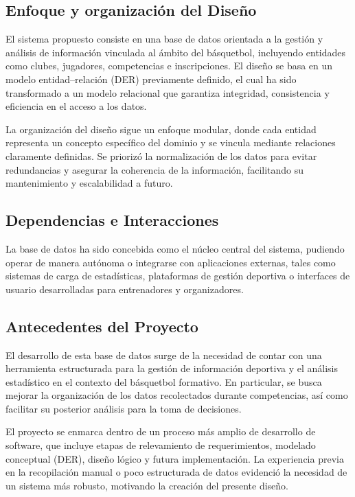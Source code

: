 \subsection{Enfoque y organización del Diseño}

El sistema propuesto consiste en una base de datos orientada a la gestión y análisis de información vinculada al ámbito del básquetbol, incluyendo entidades como clubes, jugadores, competencias e inscripciones. El diseño se basa en un modelo entidad–relación (DER) previamente definido, el cual ha sido transformado a un modelo relacional que garantiza integridad, consistencia y eficiencia en el acceso a los datos.

La organización del diseño sigue un enfoque modular, donde cada entidad representa un concepto específico del dominio y se vincula mediante relaciones claramente definidas. Se priorizó la normalización de los datos para evitar redundancias y asegurar la coherencia de la información, facilitando su mantenimiento y escalabilidad a futuro.

\subsection{Dependencias e Interacciones}

La base de datos ha sido concebida como el núcleo central del sistema, pudiendo operar de manera autónoma o integrarse con aplicaciones externas, tales como sistemas de carga de estadísticas, plataformas de gestión deportiva o interfaces de usuario desarrolladas para entrenadores y organizadores.

\subsection{Antecedentes del Proyecto}

El desarrollo de esta base de datos surge de la necesidad de contar con una herramienta estructurada para la gestión de información deportiva y el análisis estadístico en el contexto del básquetbol formativo. En particular, se busca mejorar la organización de los datos recolectados durante competencias, así como facilitar su posterior análisis para la toma de decisiones.

El proyecto se enmarca dentro de un proceso más amplio de desarrollo de software, que incluye etapas de relevamiento de requerimientos, modelado conceptual (DER), diseño lógico y futura implementación. La experiencia previa en la recopilación manual o poco estructurada de datos evidenció la necesidad de un sistema más robusto, motivando la creación del presente diseño.